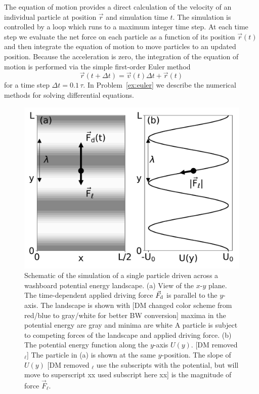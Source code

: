 \documentclass[preprint,showpacs,preprintnumbers,amsmath,amssymb,aps,prb]{revtex4-1}
\theoremstyle{remark}
\begin{document}
The equation of motion provides a direct calculation of the velocity
of an individual particle at position $\vec{r}$ 
and simulation time $t$.
The   simulation is controlled by a  loop
which runs to a maximum integer time step.
At each time step
we evaluate the net force on each particle as a function of its position
$\vec{r}(t)$
and then integrate
the equation of motion to move particles
to an updated position.
Because the acceleration is zero,
the integration of the equation of motion
is performed via 
the simple first-order Euler method 
\begin{equation}
  \vec{r}(t+\Delta t) = \vec{v}(t) \Delta t + \vec{r}(t)
    \label{eq:euler}
\end{equation}
for a time step $\Delta t = 0.1\,\tau$.
In 
Problem~\ref{ex:euler}
we describe 
the numerical methods for 
solving differential equations.
\begin{figure} %
\centering
\includegraphics[width=\columnwidth]{fig1_landscape.pdf}
\caption{
Schematic of the simulation of a single particle
  driven across a washboard potential energy landscape.
  (a) View of the $x$-$y$ plane. 
  The time-dependent applied driving force $\vec{F}_{\rm d}$
  is parallel to the $y$-axis.
  The landscape is shown with
  [DM changed color scheme from red/blue to gray/white for better BW conversion]
  maxima in the potential energy are gray %
  and minima are white %
  A particle is 
  subject to competing forces of the landscape and applied driving force.
  (b) The potential energy function
  along the $y$-axis $U(y)$.  [DM removed $_{\ell}$]
  The particle in (a) is shown at the same $y$-position.
  The slope of $U(y)$ [DM removed $_{\ell}$ use the subscripts with the potential, but will move to superscript xx used subscript here xx]
  is the 
  magnitude of force $\vec{F}_{\ell}$. 
  }
\label{fig:1_landscape}
\end{figure}
%
\end{document}
